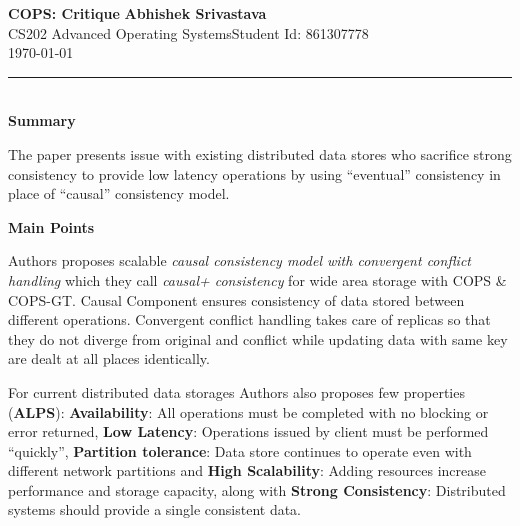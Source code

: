\documentclass[a4paper, 11pt]{article}
\begin{document}
\noindent
\large\textbf{COPS: Critique} \hfill \textbf{Abhishek Srivastava} \\
\normalsize CS202 Advanced Operating Systems\hfill Student Id: 861307778 \\
\hfill \today \\
\hrule

\noindent
\\
\large\textbf{Summary}

The paper presents issue with existing distributed data stores who sacrifice strong consistency to provide low latency operations by using ``eventual'' consistency in place of ``causal'' consistency model.

\noindent
\large\textbf{Main Points}

Authors proposes scalable \emph{causal consistency model with convergent conflict handling} which they call \emph{causal+ consistency} for wide area storage with COPS \& COPS-GT. Causal Component ensures consistency of data stored between different operations. Convergent conflict handling takes care of replicas so that they do not diverge from original and conflict while updating data with same key are dealt at all places identically.

For current distributed data storages Authors also proposes few properties (\textbf{ALPS}): \textbf{Availability}: All operations must be completed with no blocking or error returned,  \textbf{Low Latency}: Operations issued by client must be performed ``quickly'', \textbf{Partition tolerance}: Data store continues to operate even with different network partitions and \textbf{High Scalability}: Adding resources increase performance and storage capacity, along with \textbf{Strong Consistency}: Distributed systems should provide a single consistent data.
\end{document}
